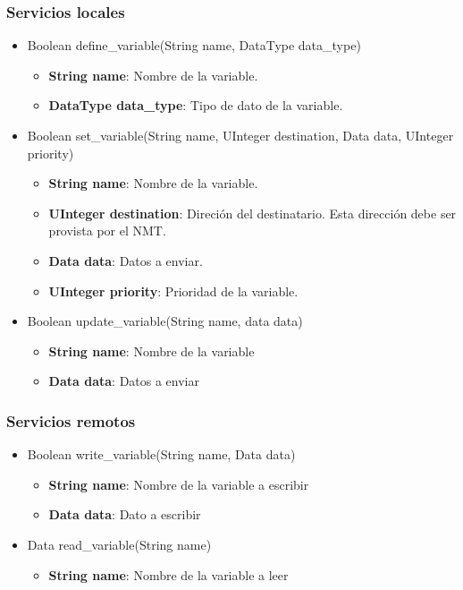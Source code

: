 \subsubsection{Servicios locales}
\begin{itemize}
  
\item Boolean define\_variable(String name, DataType data\_type)
  \begin{itemize}
  \item \textbf{String name}: Nombre de la variable.
    \item \textbf{DataType data\_type}: Tipo de dato de la variable. 
  \end{itemize}
  
\item Boolean set\_variable(String name, UInteger destination, Data data, UInteger priority)
  \begin{itemize}
    \item \textbf{String name}: Nombre de la variable.  
    \item \textbf{UInteger destination}: Direción del destinatario. Esta dirección debe ser provista por el NMT.
    \item \textbf{Data data}: Datos a enviar.
    \item \textbf{UInteger priority}: Prioridad de la variable.
  \end{itemize}
  
\item Boolean update\_variable(String name, data data)
  \begin{itemize}
    \item \textbf{String name}: Nombre de la variable
    \item \textbf{Data data}: Datos a enviar    
  \end{itemize}
 
\end{itemize}
\subsubsection{Servicios remotos}
\begin{itemize}
\item Boolean write\_variable(String name, Data data)
  \begin{itemize}
    \item \textbf{String name}: Nombre de la variable a escribir
    \item \textbf{Data data}: Dato a escribir
  \end{itemize}
\item Data read\_variable(String name)
  \begin{itemize}
    \item \textbf{String name}: Nombre de la variable a leer
  \end{itemize}
\end{itemize}

